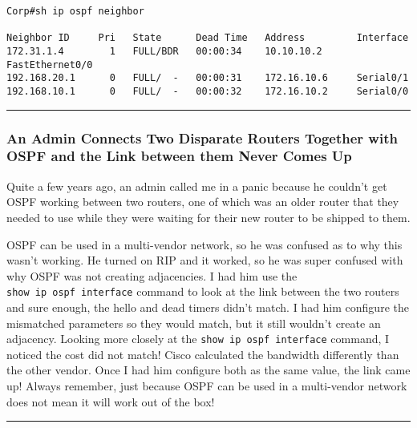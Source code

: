 \begin{verbatim}
Corp#sh ip ospf neighbor
 
Neighbor ID     Pri   State      Dead Time   Address         Interface
172.31.1.4        1   FULL/BDR   00:00:34    10.10.10.2     FastEthernet0/0
192.168.20.1      0   FULL/  -   00:00:31    172.16.10.6     Serial0/1
192.168.10.1      0   FULL/  -   00:00:32    172.16.10.2     Serial0/0
\end{verbatim}

\begin{center}\rule{0.5\linewidth}{0.5pt}\end{center}

\subsubsection[\hfill\break
An Admin Connects Two Disparate Routers Together with OSPF and the Link
between them Never Comes
Up]{\texorpdfstring{%
An Admin Connects Two Disparate Routers Together with OSPF and the Link
between them Never Comes
Up}{ An Admin Connects Two Disparate Routers Together with OSPF and the Link between them Never Comes Up}}

Quite a few years ago, an admin called me in a panic because he couldn't
get OSPF working between two routers, one of which was an older router
that they needed to use while they were waiting for their new router to
be shipped to them.

OSPF can be used in a multi-vendor network, so he was confused as to why
this wasn't working. He turned on RIP and it worked, so he was super
confused with why OSPF was
\protect\hypertarget{c18.xhtmlux5cux23Page_770}{}{}not creating
adjacencies. I had him use the \texttt{show\ ip\ ospf\ interface}
command to look at the link between the two routers and sure enough, the
hello and dead timers didn't match. I had him configure the mismatched
parameters so they would match, but it still wouldn't create an
adjacency. Looking more closely at the
\texttt{show\ ip\ ospf\ interface} command, I noticed the cost did not
match! Cisco calculated the bandwidth differently than the other vendor.
Once I had him configure both as the same value, the link came up!
Always remember, just because OSPF can be used in a multi-vendor network
does not mean it will work out of the box!

\begin{center}\rule{0.5\linewidth}{0.5pt}\end{center}

